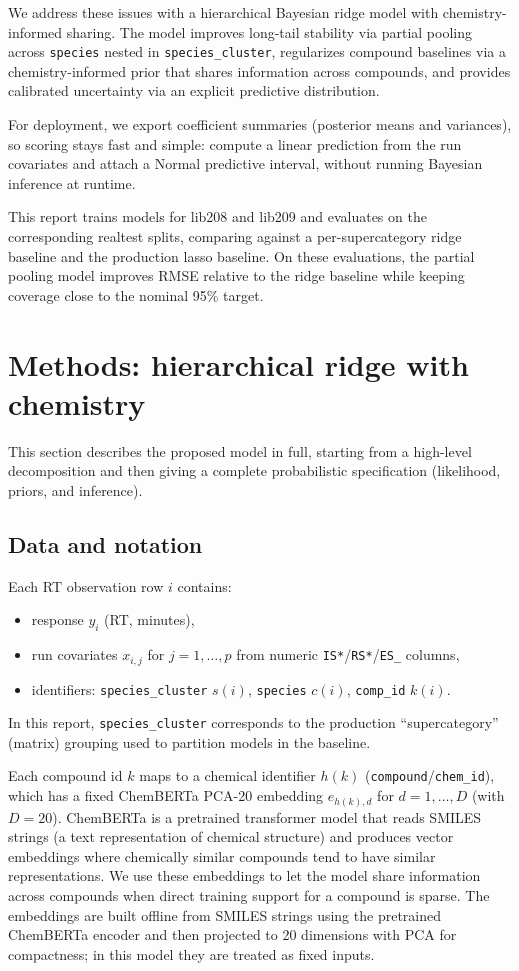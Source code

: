 \documentclass[11pt]{article}
\begin{document}
We address these issues with a hierarchical Bayesian ridge model with chemistry-informed sharing. The model improves
long-tail stability via partial pooling across \texttt{species} nested in \texttt{species\_cluster}, regularizes
compound baselines via a chemistry-informed prior that shares information across compounds, and provides calibrated
uncertainty via an explicit predictive distribution.

For deployment, we export coefficient summaries (posterior means and variances), so scoring stays fast and simple:
compute a linear prediction from the run covariates and attach a Normal predictive interval, without running Bayesian
inference at runtime.

This report trains models for lib208 and lib209 and evaluates on the corresponding realtest splits, comparing against a
per-supercategory ridge baseline and the production lasso baseline. On these evaluations, the partial pooling model
improves RMSE relative to the ridge baseline while keeping coverage close to the nominal 95\% target.

\section{Methods: hierarchical ridge with chemistry}

This section describes the proposed model in full, starting from a high-level decomposition and then giving a complete
probabilistic specification (likelihood, priors, and inference).

\subsection{Data and notation}

Each RT observation row $i$ contains:
\begin{itemize}
  \item response $y_i$ (RT, minutes),
  \item run covariates $x_{i,j}$ for $j=1,\ldots,p$ from numeric \texttt{IS*}/\texttt{RS*}/\texttt{ES\_\*} columns,
  \item identifiers: \texttt{species\_cluster} $s(i)$, \texttt{species} $c(i)$, \texttt{comp\_id} $k(i)$.
\end{itemize}
In this report, \texttt{species\_cluster} corresponds to the production ``supercategory'' (matrix) grouping used to
partition models in the baseline.

Each compound id $k$ maps to a chemical identifier $h(k)$ (\texttt{compound}/\texttt{chem\_id}), which has a fixed
ChemBERTa PCA-20 embedding $e_{h(k),d}$ for $d=1,\ldots,D$ (with $D=20$). ChemBERTa is a pretrained transformer model
that reads SMILES strings (a text representation of chemical structure) and produces vector embeddings where chemically
similar compounds tend to have similar representations. We use these embeddings to let the model share information
across compounds when direct training support for a compound is sparse. The embeddings are built offline from SMILES
strings using the pretrained ChemBERTa encoder and then projected to 20 dimensions with PCA for compactness; in this
model they are treated as fixed inputs.
\end{document}
